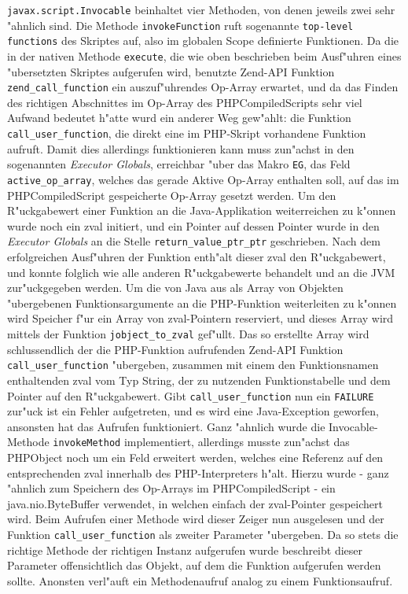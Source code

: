 \texttt{javax.script.Invocable} beinhaltet vier Methoden, von denen jeweils zwei sehr "ahnlich sind. Die Methode \texttt{invokeFunction} ruft sogenannte \texttt{top-level functions}
des Skriptes auf, also im globalen Scope definierte Funktionen. Da die in der nativen Methode \texttt{execute}, die wie oben beschrieben beim Ausf"uhren 
eines "ubersetzten Skriptes aufgerufen wird, benutzte Zend-API Funktion \texttt{zend\_call\_function} ein auszuf"uhrendes Op-Array erwartet, und da das Finden des
richtigen Abschnittes im Op-Array des PHPCompiledScripts sehr viel Aufwand bedeutet h"atte wurd ein anderer Weg gew"ahlt: die Funktion \texttt{call\_user\_function}, die
direkt eine im PHP-Skript vorhandene Funktion aufruft. Damit dies allerdings funktionieren kann muss zun"achst in den sogenannten \emph{Executor Globals}, erreichbar
"uber das Makro \texttt{EG}, das Feld \texttt{active\_op\_array}, welches das gerade Aktive Op-Array enthalten soll, auf das im PHPCompiledScript gespeicherte
Op-Array gesetzt werden.
Um den R"uckgabewert einer Funktion an die Java-Applikation weiterreichen zu k"onnen wurde noch ein zval initiert, und ein Pointer auf dessen Pointer wurde in den 
\emph{Executor Globals} an die Stelle \texttt{return\_value\_ptr\_ptr} geschrieben. Nach dem erfolgreichen Ausf"uhren der Funktion enth"alt dieser zval den R"uckgabewert,
und konnte folglich wie alle anderen R"uckgabewerte behandelt und an die JVM zur"uckgegeben werden.
Um die von Java aus als Array von Objekten "ubergebenen Funktionsargumente an die PHP-Funktion weiterleiten zu k"onnen wird Speicher f"ur ein Array
von zval-Pointern reserviert, und dieses Array wird mittels der Funktion \texttt{jobject\_to\_zval} gef"ullt. Das so erstellte Array wird schlussendlich der die PHP-Funktion
aufrufenden Zend-API Funktion \texttt{call\_user\_function} "ubergeben, zusammen mit einem den Funktionsnamen enthaltenden zval vom Typ String, der zu nutzenden 
Funktionstabelle und dem Pointer auf den R"uckgabewert. Gibt \texttt{call\_user\_function} nun ein \texttt{FAILURE} zur"uck ist ein Fehler aufgetreten, und es wird
eine Java-Exception geworfen, ansonsten hat das Aufrufen funktioniert.
Ganz "ahnlich wurde die Invocable-Methode \texttt{invokeMethod} implementiert, allerdings musste zun"achst das PHPObject noch um ein Feld erweitert werden, welches
eine Referenz auf den entsprechenden zval innerhalb des PHP-Interpreters h"alt. Hierzu wurde - ganz "ahnlich zum Speichern des Op-Arrays im PHPCompiledScript -
ein java.nio.ByteBuffer verwendet, in welchen einfach der zval-Pointer gespeichert wird. Beim Aufrufen einer Methode wird dieser Zeiger nun ausgelesen und
der Funktion \texttt{call\_user\_function} als zweiter Parameter "ubergeben. Da so stets die richtige Methode der richtigen Instanz aufgerufen wurde
beschreibt dieser Parameter offensichtlich das Objekt, auf dem die Funktion aufgerufen werden sollte. Anonsten verl"auft ein Methodenaufruf analog
zu einem Funktionsaufruf.

